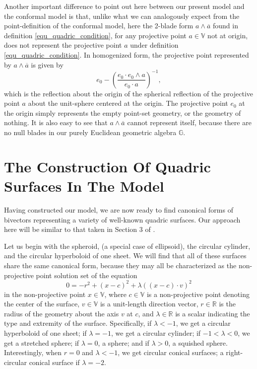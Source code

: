 \documentclass{birkjour}
\theoremstyle{definition}
\theoremstyle{remark}
\numberwithin{equation}{section}
\newcommand{\G}{\mathbb{G}}
\newcommand{\V}{\mathbb{V}}
\newcommand{\R}{\mathbb{R}}
\begin{document}
Another important difference to point out here between our present model and the conformal model is that,
unlike what we can analogously expect from the point-definition of the conformal model,
here the 2-blade form $a\wedge\overline{a}$ found in definition \eqref{equ_quadric_condition}, for
any projective point $a\in\V$ not at origin, does not represent the projective point $a$ under definition \eqref{equ_quadric_condition}.
In homogenized form, the projective point represented by $a\wedge\overline{a}$ is given by
\begin{equation}
e_0 - \left(\frac{e_0\cdot e_0\wedge a}{e_0\cdot a}\right)^{-1},
\end{equation}
which is the reflection about the origin of the spherical reflection of the projective point $a$
about the unit-sphere centered at the origin.  The projective point $e_0$ at the origin
simply represents the empty point-set geometry, or the geometry of nothing.  It is also
easy to see that $a\wedge\overline{a}$ cannot represent itself, because there are no
null blades in our purely Euclidean geometric algebra $\G$.

\section{The Construction Of Quadric Surfaces In The Model}

Having constructed our model, we are now ready to find canonical forms of bivectors
representing a variety of well-known quadric surfaces.  Our approach here will be
similar to that taken in Section 3 of \cite{Miller87}.

Let us begin with the
spheroid, (a special case of ellipsoid), the circular cylinder, and the circular hyperboloid
of one sheet.  We will find that all of these surfaces share the same canonical form,
because they may all be characterized as the non-projective point solution set of the equation
\begin{equation}\label{equ_spheroid}
0 = -r^2 + (x-c)^2 + \lambda((x-c)\cdot v)^2
\end{equation}
in the non-projective point $x\in\V$, where $c\in\V$ is a non-projective
point denoting the center of the surface, $v\in\V$ is a unit-length direction
vector, $r\in\R$ is the radius of the geometry about the axis $v$ at $c$, and
$\lambda\in\R$ is a scalar indicating the type and extremity of the surface.
Specifically, if $\lambda<-1$, we get a circular hyperboloid of one sheet;
if $\lambda=-1$, we get a circular cylinder; if $-1<\lambda<0$, we get a stretched
sphere; if $\lambda=0$, a sphere; and if $\lambda>0$, a squished sphere.  Interestingly,
when $r=0$ and $\lambda<-1$, we get circular conical surfaces; a right-circular conical
surface if $\lambda=-2$.
\end{document}
